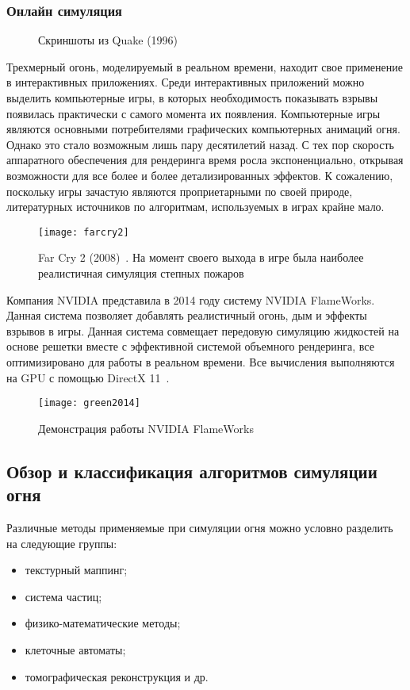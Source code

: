 \subsubsection{Онлайн симуляция}
\begin{figure}%
    \centering
    \qquad
    \caption{Скриншоты из Quake (1996)~\cite{capstone}}%
    \label{fig:example}%
\end{figure}
Трехмерный огонь, моделируемый в реальном времени, находит свое применение в
интерактивных приложениях. Среди интерактивных приложений можно выделить
компьютерные игры, в которых необходимость показывать взрывы появилась
практически с самого момента их появления. Компьютерные игры являются основными
потребителями графических компьютерных анимаций огня. Однако это стало возможным
лишь пару десятилетий назад. С тех пор скорость аппаратного обеспечения для
рендеринга время росла экспоненциально, открывая возможности для все более и
более детализированных эффектов. К сожалению, поскольку игры зачастую являются
проприетарными по своей природе, литературных источников по алгоритмам,
используемых в играх крайне мало.
\begin{figure}[htb]
	\centering
	\texttt{[image: farcry2]}
	\caption{Far Cry 2 (2008)~\cite{farcry2}. На момент своего выхода в игре
	была наиболее реалистичная симуляция степных пожаров}
\end{figure}
Компания NVIDIA представила в 2014 году систему NVIDIA FlameWorks. Данная
система позволяет добавлять реалистичный огонь, дым и эффекты взрывов в игры.
Данная система совмещает передовую симуляцию жидкостей на основе решетки вместе
с эффективной системой объемного рендеринга, все оптимизировано для работы в
реальном времени. Все вычисления выполняются на GPU с помощью DirectX
11~\cite{Green:2014:NFR:2633956.2658828}.
\begin{figure}[htb]
	\centering
	\texttt{[image: green2014]}
	\caption{Демонстрация работы NVIDIA FlameWorks}
\end{figure}
\subsection{Обзор и классификация алгоритмов симуляции огня}
Различные методы применяемые при симуляции огня можно условно разделить на
следующие группы:
\begin{itemize}
	\item текстурный маппинг;
	\item система частиц;
	\item физико-математические методы;
	\item клеточные автоматы;
	\item томографическая реконструкция и др.
\end{itemize}

